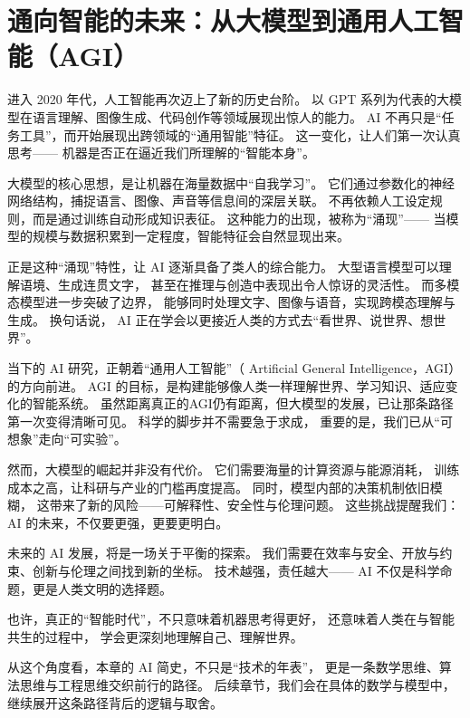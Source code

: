 \section{通向智能的未来：从大模型到通用人工智能（AGI）}

进入 2020 年代，人工智能再次迈上了新的历史台阶。  
以 GPT 系列为代表的大模型在语言理解、图像生成、代码创作等领域展现出惊人的能力。  
 AI  不再只是“任务工具”，而开始展现出跨领域的“通用智能”特征。  
这一变化，让人们第一次认真思考——  
机器是否正在逼近我们所理解的“智能本身”。  

大模型的核心思想，是让机器在海量数据中“自我学习”。  
它们通过参数化的神经网络结构，捕捉语言、图像、声音等信息间的深层关联。  
不再依赖人工设定规则，而是通过训练自动形成知识表征。  
这种能力的出现，被称为“涌现”——  
当模型的规模与数据积累到一定程度，智能特征会自然显现出来。  

正是这种“涌现”特性，让 AI 逐渐具备了类人的综合能力。  
大型语言模型可以理解语境、生成连贯文字，  
甚至在推理与创造中表现出令人惊讶的灵活性。  
而多模态模型进一步突破了边界，  
能够同时处理文字、图像与语音，实现跨模态理解与生成。  
换句话说， AI 正在学会以更接近人类的方式去“看世界、说世界、想世界”。  

当下的 AI 研究，正朝着“通用人工智能”（ Artificial General Intelligence，AGI）的方向前进。  
AGI 的目标，是构建能够像人类一样理解世界、学习知识、适应变化的智能系统。  
虽然距离真正的AGI仍有距离，但大模型的发展，已让那条路径第一次变得清晰可见。  
科学的脚步并不需要急于求成，  
重要的是，我们已从“可想象”走向“可实验”。  

然而，大模型的崛起并非没有代价。  
它们需要海量的计算资源与能源消耗，  
训练成本之高，让科研与产业的门槛再度提高。  
同时，模型内部的决策机制依旧模糊，  
这带来了新的风险——可解释性、安全性与伦理问题。  
这些挑战提醒我们： AI 的未来，不仅要更强，更要更明白。  

未来的 AI 发展，将是一场关于平衡的探索。  
我们需要在效率与安全、开放与约束、创新与伦理之间找到新的坐标。  
技术越强，责任越大——  
 AI  不仅是科学命题，更是人类文明的选择题。  
 
也许，真正的“智能时代”，不只意味着机器思考得更好，  
还意味着人类在与智能共生的过程中，  
学会更深刻地理解自己、理解世界。  

从这个角度看，本章的 AI 简史，不只是“技术的年表”，  
更是一条数学思维、算法思维与工程思维交织前行的路径。  
后续章节，我们会在具体的数学与模型中，继续展开这条路径背后的逻辑与取舍。  
